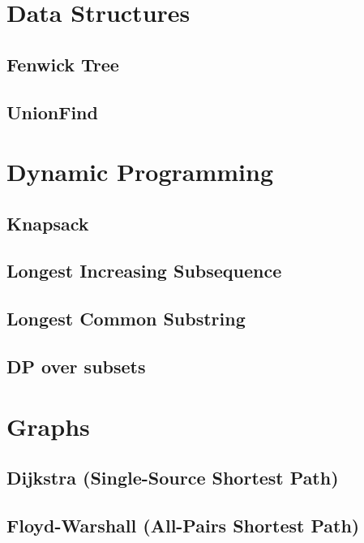 \documentclass{article}
\begin{document}
\section{Data Structures}
	\subsection{Fenwick Tree}
	
    
    \newpage
    \subsection{UnionFind}
	

	\newpage
\section{Dynamic Programming}
	\subsection{Knapsack}
	

	\subsection{Longest Increasing Subsequence}
	

	\newpage
	\subsection{Longest Common Substring}
	

	\subsection{DP over subsets}
	

	\newpage
\section{Graphs}
	\subsection{Dijkstra (Single-Source Shortest Path)}
	

	\subsection{Floyd-Warshall (All-Pairs Shortest Path)}
	
	
\end{document}
